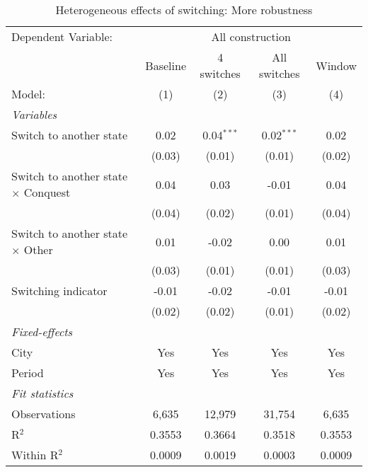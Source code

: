 \begin{table}[htbp]
   \caption{\label{tab:robustness_50y} Heterogeneous effects of switching: More robustness}
   \centering
   \begin{tabular}{lcccc}
      \tabularnewline \midrule \midrule
      Dependent Variable: & \multicolumn{4}{c}{All construction}\\
                                                 & Baseline & 4 switches   & All switches & Window \\   
      Model:                                     & (1)      & (2)          & (3)          & (4)\\  
      \midrule
      \emph{Variables}\\
      Switch to another state                    & 0.02     & 0.04$^{***}$ & 0.02$^{***}$ & 0.02\\   
                                                 & (0.03)   & (0.01)       & (0.01)       & (0.02)\\   
      Switch to another state $\times$ Conquest  & 0.04     & 0.03         & -0.01        & 0.04\\   
                                                 & (0.04)   & (0.02)       & (0.01)       & (0.04)\\   
      Switch to another state $\times$ Other     & 0.01     & -0.02        & 0.00         & 0.01\\   
                                                 & (0.03)   & (0.01)       & (0.01)       & (0.03)\\   
      Switching indicator                        & -0.01    & -0.02        & -0.01        & -0.01\\   
                                                 & (0.02)   & (0.02)       & (0.01)       & (0.02)\\   
      \midrule
      \emph{Fixed-effects}\\
      City                                       & Yes      & Yes          & Yes          & Yes\\  
      Period                                     & Yes      & Yes          & Yes          & Yes\\  
      \midrule
      \emph{Fit statistics}\\
      Observations                               & 6,635    & 12,979       & 31,754       & 6,635\\  
      R$^2$                                      & 0.3553   & 0.3664       & 0.3518       & 0.3553\\  
      Within R$^2$                               & 0.0009   & 0.0019       & 0.0003       & 0.0009\\  
      \midrule \midrule
      

\end{tabular}
\end{table}
